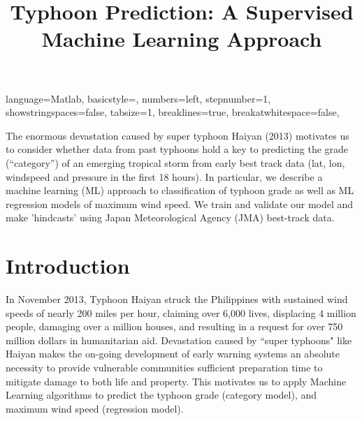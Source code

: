 \documentclass{SBCbookchapter}
\title{Typhoon Prediction: A Supervised Machine Learning Approach}
\begin{document}
	\maketitle
	\lstset
	{ %
		language=Matlab,
		basicstyle=\footnotesize,
		numbers=left,
		stepnumber=1,
		showstringspaces=false,
		tabsize=1,
		breaklines=true,
		breakatwhitespace=false,
	}
	
	
	
	
	\vspace{.3in}
	\begin{minipage}[r]{4.25in}{\small
			The enormous devastation caused by super typhoon Haiyan (2013) motivates us to consider whether data from past typhoons hold a key to predicting the grade (``category'') of an emerging tropical storm from early best track data (lat, lon, windspeed and pressure in the first 18 hours). In particular, we describe a machine learning (ML) approach to classification of typhoon grade as well as ML regression models of maximum wind speed. We train and validate our model and make 'hindcasts' using Japan Meteorological Agency (JMA) best-track data.}
	\end{minipage}
	
	\newpage
	
	\section{Introduction}
	
	In November 2013, Typhoon Haiyan struck the Philippines with sustained wind speeds of nearly 200
	miles per hour, claiming over 6,000 lives, displacing 4 million people, damaging over a million houses,
	and resulting in a request for over 750 million dollars
	in humanitarian aid. Devastation caused by
	``super typhoons" like Haiyan makes the on-going
	development of early warning systems an absolute
	necessity to provide vulnerable communities sufficient preparation time to
	mitigate damage to both life and property. This motivates us to apply Machine Learning algorithms to predict the typhoon grade (category model), and maximum wind speed (regression model).
	
\end{document}
